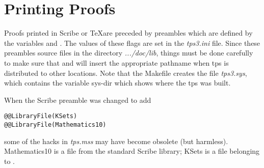 \section{Printing Proofs}

Proofs printed in Scribe or \TeX are preceded by preambles which are
defined by the variables  and 
. The values of these flags are set
in the {\it tps3.ini} file. Since these preambles source
files in the directory {\it .../doc/lib}, things must be done carefully to
make sure that  and  
will insert the appropriate pathname when tps is distributed to other 
locations. Note that the Makefile creates the file {\it tps3.sys}, which contains the variable
sys-dir which shows where the tps was built.
	
When the Scribe preamble was changed to add
\begin{verbatim}
@@LibraryFile(KSets)
@@LibraryFile(Mathematics10)
\end{verbatim}
some of the hacks in {\it tps.mss} may have become obsolete (but harmless).
Mathematics10 is a file from the standard Scribe library; KSets
is a file belonging to \tps.

